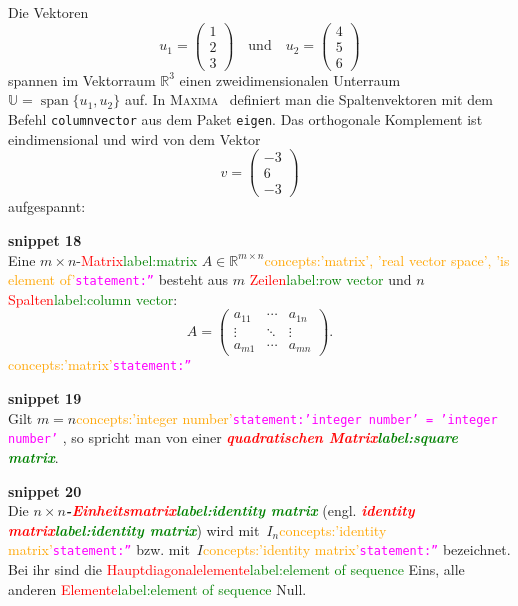 \documentclass[a4paper,twoside,english,ngerman,deutsch,german,sectrefs,envcountsame,envcountchap]{svmono}
\newcommand{\setref}[2]{\textcolor{red}{#1}\textcolor{green}{#2}}
\newcommand{\snippet}[1]{\textbf{snippet #1}\\}
\newcommand{\eqnote}[2]{\textcolor{orange}{#1}\textcolor{magenta}{\texttt{#2}}}
\begin{document}
\begin{example}
\label{exa:orthogonales-Komplement}Die Vektoren
\[
u_{1}=\left(\begin{array}{c} 1\\ 2\\ 3
\end{array}\right)\quad\text{und}\quad u_{2}=\left(\begin{array}{c}
4\\ 5\\ 6
\end{array}\right)
\]
spannen im Vektorraum ${\mathbb{R}}^{3}$ einen zweidimensionalen Unterraum $\mathbb{U}={\operatorname{span}}\{u_{1},u_{2}\}$ auf. In \textsc{Maxima}~\cite{maxima,haager2014} definiert man die Spaltenvektoren mit dem Befehl \texttt{columnvector} aus dem Paket \texttt{eigen}. Das orthogonale Komplement ist eindimensional und wird von dem Vektor
\[
v=\left(\begin{array}{c} -3\\ 6\\ -3
\end{array}\right)
\]
aufgespannt:


\end{example}


\snippet{18}
Eine $m\times n$-\setref{Matrix}{label:matrix} $A\in{\mathbb{R}}^{m\times n}$\eqnote{concepts:'matrix', 'real vector space', 'is element of'}{statement:''} besteht aus $m$ \setref{Zeilen}{label:row vector} und $n$ \setref{Spalten}{label:column vector}:
\[
A=\left(\begin{array}{ccc} a_{11} & \cdots & a_{1n}\\
\vdots & \ddots & \vdots\\
a_{m1} & \cdots & a_{mn}
\end{array}\right).
\]\eqnote{concepts:'matrix'}{statement:''}

\snippet{19}
Gilt $m=n$\eqnote{concepts:'integer number'}{statement:'integer number' = 'integer number'} , so spricht man von einer \textbf{\em \setref{quadratischen Matrix}{label:square matrix}}.

\snippet{20}
Die $n\times n$\textbf{\em -\setref{Einheitsmatrix}{label:identity matrix}} (engl. \textbf{\em \setref{identity matrix}{label:identity matrix}}) wird mit~$I_{n}$\eqnote{concepts:'identity matrix'}{statement:''} bzw. mit~$I$\eqnote{concepts:'identity matrix'}{statement:''} bezeichnet. Bei ihr sind die \setref{Hauptdiagonalelemente}{label:element of sequence} Eins, alle anderen \setref{Elemente}{label:element of sequence} Null.
\end{document}
